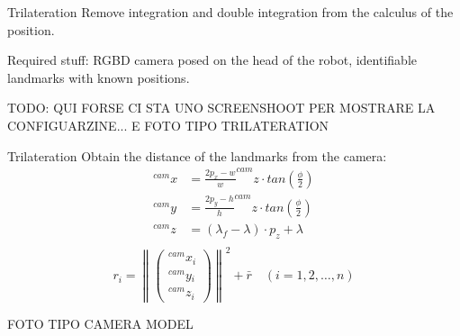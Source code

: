 \documentclass[10pt]{beamer}
\newcommand\norm[1]{\left\lVert#1\right\rVert}
\begin{document}
    \begin{frame}[fragile]{Trilateration}
      Remove integration and double integration from the calculus of the position.

      Required stuff: RGBD camera posed on the head of the robot, identifiable landmarks with known positions.

      TODO: QUI FORSE CI STA UNO SCREENSHOOT PER MOSTRARE LA CONFIGUARZINE... E FOTO TIPO TRILATERATION
    \end{frame}

    \begin{frame}[fragile]{Trilateration}
        Obtain the distance of the landmarks from the camera:
        \begin{align*}
            ^{cam}{x}{} &= \frac{2 p_x - w}{w} ^{cam}{z}{} \cdot tan\left(\frac{\phi}{2}\right) \\
            ^{cam}{y}{} &= \frac{2 p_y - h}{h} ^{cam}{z}{} \cdot tan\left(\frac{\phi}{2}\right) \\
            ^{cam}{z}{} &= (\lambda_f - \lambda) \cdot p_z + \lambda \\
        \end{align*}
        \begin{equation*}
            r_i =
            \norm{
                \begin{pmatrix}
                    ^{cam}{x}{_i} \\
                    ^{cam}{y}{_i} \\
                    ^{cam}{z}{_i}
                \end{pmatrix}
                }^2 + \bar{r} \quad (i = 1, 2, \dots, n)
        \end{equation*}


        FOTO TIPO CAMERA MODEL
    \end{frame}
\end{document}
